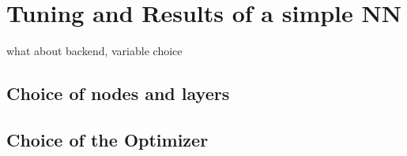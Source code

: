 \chapter{Tuning and Results of a simple NN}

what about backend, variable choice


\section{Choice of nodes and layers}

\section{Choice of the Optimizer}